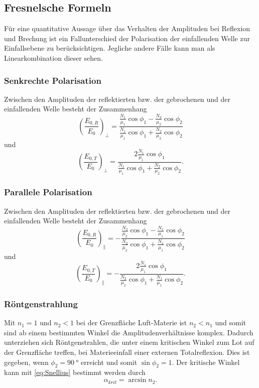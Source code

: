 \subsection{Fresnelsche Formeln}
Für eine quantitative Aussage über das Verhalten der Amplituden bei Reflexion und Brechung ist ein Fallunterschied der Polarisation der einfallenden Welle zur Einfallsebene zu berücksichtigen.
Jegliche andere Fälle kann man als Linearkombination dieser sehen.\cite{physik}
\subsubsection*{Senkrechte Polarisation}
Zwischen den Amplituden der reflektierten bzw. der gebrochenen und der einfallenden Welle besteht der Zusammenhang
\begin{equation}
    \left(\frac{E_{0,R}}{E_0}\right)_\perp = \frac{\frac{N_1}{\mu_1}\cos\phi_1 - \frac{N_2}{\mu_2}\cos\phi_2}{\frac{N_1}{\mu_1}\cos\phi_1 + \frac{N_2}{\mu_2}\cos\phi_2}
\end{equation}
und
\begin{equation}
    \left(\frac{E_{0,T}}{E_0}\right)_\perp = \frac{2\frac{N_1}{\mu_1}\cos\phi_1}{\frac{N_1}{\mu_1}\cos\phi_1 + \frac{N_2}{\mu_2}\cos\phi_2}\text{.}
\end{equation}
\subsubsection*{Parallele Polarisation}
Zwischen den Amplituden der reflektierten bzw. der gebrochenen und der einfallenden Welle besteht der Zusammenhang
\begin{equation}
    \left(\frac{E_{0,R}}{E_0}\right)_\parallel = -\frac{\frac{N_2}{\mu_2}\cos\phi_1 - \frac{N_1}{\mu_1}\cos\phi_2}{\frac{N_2}{\mu_2}\cos\phi_1 + \frac{N_1}{\mu_1}\cos\phi_2}
\end{equation}
und
\begin{equation}
    \left(\frac{E_{0,T}}{E_0}\right)_\parallel = -\frac{2\frac{N_1}{\mu_1}\cos\phi_1}{\frac{N_2}{\mu_2}\cos\phi_1 + \frac{N_1}{\mu_1}\cos\phi_2}\text{.}
\end{equation}
\subsubsection*{Röntgenstrahlung}
Mit $n_1 = 1$ und $n_2 < 1$ bei der Grenzfläche Luft-Materie ist $n_2 < n_1$ und somit sind ab einem bestimmten Winkel die Amplitudenverhältnisse komplex.\cite{nolting}
Dadurch unterziehen sich Röntgenstrahlen, die unter einem kritischen Winkel zum Lot auf der Grenzfläche treffen, bei Materieeinfall einer externen Totalreflexion.\cite{reflexion}
Dies ist gegeben, wenn $\phi_2 = \qty{90}{\degree}$ erreicht und somit $\sin\phi_2 = 1$. Der kritische Winkel kann mit \autoref{eq:Snellius} bestimmt werden durch
\begin{equation}
    \alpha_{krit} = \arcsin n_2 \text{.} \label{eq:krit}
\end{equation}

